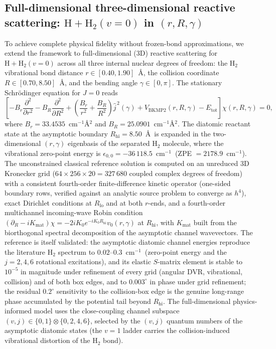 \documentclass[11pt,a4paper]{article}
\newcommand{\cmi}{\ensuremath{\mathrm{cm}^{-1}}}
\begin{document}
\subsection{Full-dimensional three-dimensional reactive scattering: $\mathrm{H} + \mathrm{H}_2(v=0)$ in $(r, R, \gamma)$}
\label{sec:bkmp2_scatter_3d}

To achieve complete physical fidelity without frozen-bond approximations, we extend
the framework to full-dimensional ($3\mathrm{D}$) reactive scattering for
$\mathrm{H} + \mathrm{H}_2(v=0)$ across all three internal nuclear degrees of freedom:
the $\mathrm{H}_2$ vibrational bond distance $r \in [0.40, 1.90]$~\AA, the collision coordinate
$R \in [0.70, 8.50]$~\AA, and the bending angle $\gamma \in [0, \pi]$.
The stationary Schr\"odinger equation for $J=0$ reads
\begin{equation}
 \left[ -B_r \frac{\partial^2}{\partial r^2} - B_R \frac{\partial^2}{\partial R^2} + \left( \frac{B_r}{r^2} + \frac{B_R}{R^2} \right) \hat j^{\,2}(\gamma) + V_{\mathrm{BKMP2}}(r, R, \gamma) - E_{\mathrm{tot}} \right] \chi(r, R, \gamma) = 0 ,
\end{equation}
where $B_r = 33.4535$~\cmi{}\AA$^2$ and $B_R = 25.0901$~\cmi{}\AA$^2$.
The diatomic reactant state at the asymptotic boundary $R_{\mathrm{hi}} = 8.50$~\AA\ is
expanded in the two-dimensional $(r, \gamma)$ eigenbasis of the separated $\mathrm{H}_2$ molecule,
where the vibrational zero-point energy is $\epsilon_{0, 0} = -36\,118.5$~\cmi\ (ZPE $= 2178.9$~\cmi).
The unconstrained classical reference solution is computed on an unreduced 3D Kronecker grid
($64 \times 256 \times 20 = 327\,680$ coupled complex degrees of freedom) with a consistent
fourth-order finite-difference kinetic operator (one-sided boundary rows, verified against an
analytic source problem to converge as $h^4$), exact Dirichlet conditions at $R_{\mathrm{lo}}$
and at both $r$-ends, and a fourth-order multichannel incoming-wave Robin condition
$\left(\partial_R - i K_{\mathrm{mat}}\right)\chi = -2 i K_0 e^{-i K_0 R_{\mathrm{hi}}} v_0(r, \gamma)$
at $R_{\mathrm{hi}}$, with $K_{\mathrm{mat}}$ built from the biorthogonal spectral decomposition
of the asymptotic channel wavevectors.
The reference is itself validated: the asymptotic diatomic channel energies reproduce the
literature $\mathrm{H}_2$ spectrum to $0.02$--$0.3$~\cmi\ (zero-point energy and the
$j = 2, 4, 6$ rotational excitations), and its elastic $S$-matrix element is stable to
$10^{-5}$ in magnitude under refinement of every grid (angular DVR, vibrational, collision)
and of both box edges, and to $0.003^{\circ}$ in phase under grid refinement; the residual
$0.2^{\circ}$ sensitivity to the collision-box edge is the genuine long-range phase
accumulated by the potential tail beyond $R_{\mathrm{hi}}$.
The full-dimensional physics-informed model uses the close-coupling channel subspace
$(v, j) \in \{0, 1\} \otimes \{0, 2, 4, 6\}$, selected by the $(v, j)$ quantum numbers of
the asymptotic diatomic states (the $v = 1$ ladder carries the collision-induced vibrational
distortion of the $\mathrm{H}_2$ bond).
\end{document}

